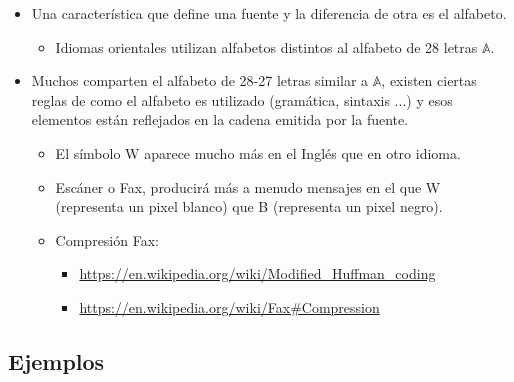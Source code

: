 \documentclass{beamer}
\begin{document}


\begin{frame}      \small

\begin{itemize}
\item Una característica que define una fuente y la diferencia de otra es el alfabeto. 
 
     \begin{itemize}
    	  \item Idiomas orientales utilizan alfabetos distintos al alfabeto de 28 letras $\mathbb{A}$. 
     \end{itemize}
 
\item Muchos comparten el alfabeto de 28-27 letras similar a $\mathbb{A}$, existen ciertas reglas de como el alfabeto es utilizado (gramática, sintaxis ...) y esos elementos están reflejados en la cadena emitida por la fuente.

\begin{itemize}
 
\item El símbolo W aparece mucho más en el Inglés que en otro idioma. 

 \item Escáner o Fax, producirá más a menudo mensajes en el que W (representa un pixel blanco)  que B (representa un pixel negro). 
 \item Compresión Fax:

        \begin{itemize}
         \item  \url{https://en.wikipedia.org/wiki/Modified\_Huffman\_coding}
         \item  \url{https://en.wikipedia.org/wiki/Fax#Compression}
         \end{itemize}
\end{itemize}
\end{itemize}
\end{frame}


\subsection{Ejemplos}
\end{document}
